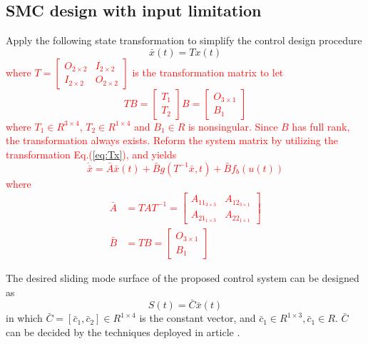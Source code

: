 \documentclass[3p]{elsarticle}
\theoremstyle{plain}
\begin{document}
\subsection{SMC design with input limitation}
Apply the following state transformation to simplify the control design procedure
\begin{equation}
\bar{x}(t) = Tx(t)\label{eq:Tx}
\end{equation}
\textcolor{red}{
where $T=\begin{bmatrix}O_{2\times 2} &I_{2\times 2}\\ I_{2\times 2} &O_{2\times 2}\end{bmatrix}$ is the transformation matrix to let
\begin{equation}
TB =
\begin{bmatrix}
T_1\\T_2
\end{bmatrix}B
=
\begin{bmatrix}
O_{3 \times 1}\\B_1
\end{bmatrix}\label{eq:TB}
\end{equation}
where $T_1 \in R^{3\times 4}$, $T_2 \in R^{1 \times 4}$ and $B_1 \in R$ is nonsingular. Since $B$ has full rank, the transformation always exists. Reform the system matrix by utilizing the transformation Eq.(\ref{eq:Tx}), and yields
\begin{equation}
\dot{\bar{x}} = \bar{A}\bar{x}(t) + \bar{B} g(T^{-1}\bar{x},t) + \bar{B} f_b(u(t)) \label{eq:barABC}
\end{equation}
where
\begin{align*}
\bar{A} &= TAT^{-1}=\begin{bmatrix}
A_{11_{3\times 3}}
&A_{12_{3\times 1}}\\
A_{21_{1\times 3}}
&A_{22_{1\times 1}}\end{bmatrix}\\
\bar{B} &= TB = \begin{bmatrix}O_{3\times 1}\\B_{1}\end{bmatrix}
\end{align*}}\par
The desired sliding mode surface of the proposed control system can be designed as
\begin{equation}
S(t) = \bar{C}\bar{x}(t)\label{eq:S}
\end{equation}
in which $\bar{C} = [\bar{c}_1,\bar{c}_2]\in R^{1\times 4}$ is the constant vector, and $\bar{c}_1\in R^{1\times 3},\bar{c}_1\in R$. $\bar{C}$ can be decided by the techniques deployed in article \cite{lyshevski2012control}.\par
\end{document}
